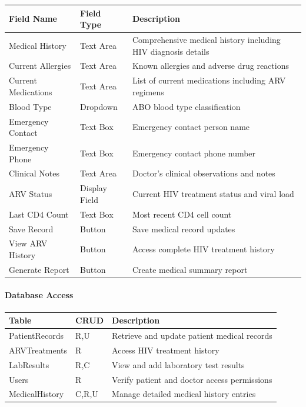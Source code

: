 \documentclass[12pt,a4paper]{article}
\begin{document}
\begin{longtable}{|p{3cm}|p{3cm}|p{8cm}|}
\hline
\textbf{Field Name} & \textbf{Field Type} & \textbf{Description} \\
\hline
Medical History & Text Area & Comprehensive medical history including HIV diagnosis details \\
\hline
Current Allergies & Text Area & Known allergies and adverse drug reactions \\
\hline
Current Medications & Text Area & List of current medications including ARV regimens \\
\hline
Blood Type & Dropdown & ABO blood type classification \\
\hline
Emergency Contact & Text Box & Emergency contact person name \\
\hline
Emergency Phone & Text Box & Emergency contact phone number \\
\hline
Clinical Notes & Text Area & Doctor's clinical observations and notes \\
\hline
ARV Status & Display Field & Current HIV treatment status and viral load \\
\hline
Last CD4 Count & Text Box & Most recent CD4 cell count \\
\hline
Save Record & Button & Save medical record updates \\
\hline
View ARV History & Button & Access complete HIV treatment history \\
\hline
Generate Report & Button & Create medical summary report \\
\hline
\end{longtable}

\paragraph{Database Access}

\begin{longtable}{|p{3cm}|p{2cm}|p{9cm}|}
\hline
\textbf{Table} & \textbf{CRUD} & \textbf{Description} \\
\hline
PatientRecords & R,U & Retrieve and update patient medical records \\
\hline
ARVTreatments & R & Access HIV treatment history \\
\hline
LabResults & R,C & View and add laboratory test results \\
\hline
Users & R & Verify patient and doctor access permissions \\
\hline
MedicalHistory & C,R,U & Manage detailed medical history entries \\
\hline
\end{longtable}
\end{document}
